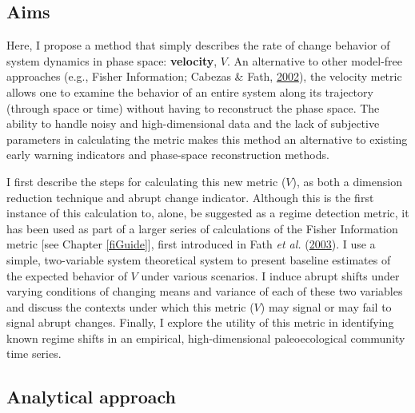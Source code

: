 \documentclass[12pt,twoside,openany]{reedthesis}
\begin{document}
\hypertarget{aims-1}{%
\subsection{Aims}\label{aims-1}}

Here, I propose a method that simply describes the rate of change behavior of system dynamics in phase space: \textbf{velocity}, \(V\). An alternative to other model-free approaches (e.g., Fisher Information; Cabezas \& Fath, \protect\hyperlink{ref-cabezas_towards_2002}{2002}), the velocity metric allows one to examine the behavior of an entire system along its trajectory
(through space or time) without having to reconstruct the phase space. The ability to handle noisy and high-dimensional data and the lack of subjective parameters in calculating the metric makes this method an alternative to existing early warning indicators and phase-space reconstruction methods.

I first describe the steps for calculating this new metric (\(V\)), as both a dimension reduction technique and abrupt change indicator. Although this is the first instance of this calculation to, alone, be suggested as a regime detection metric, it has been used as part of a larger series of calculations of the Fisher Information metric {[}see Chapter \ref{fiGuide}{]}, first introduced in Fath \emph{et al.} (\protect\hyperlink{ref-fath_regime_2003}{2003}). I use a simple, two-variable system theoretical system to present baseline estimates of the expected behavior of \(V\) under various scenarios. I induce abrupt shifts under varying conditions of changing means and variance of each of these two variables and discuss the contexts under which this metric (\(V\)) may signal or may fail to signal abrupt changes. Finally, I explore the utility of this metric in identifying known regime shifts in an empirical, high-dimensional paleoecological community time series.

\hypertarget{analytical-approach}{%
\subsection{Analytical approach}\label{analytical-approach}}
\end{document}
